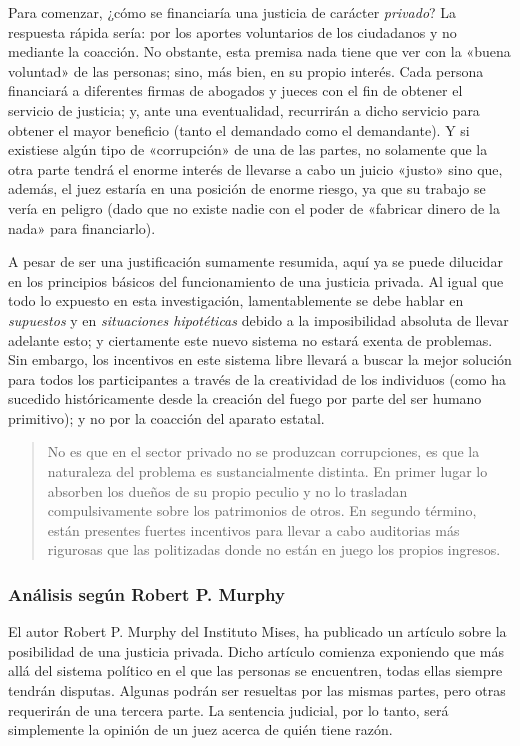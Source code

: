 \documentclass[12pt,a4paper,twoside]{book}
\begin{document}
Para comenzar, ¿cómo se financiaría una justicia de carácter \textit{privado}? La respuesta rápida sería: por los aportes voluntarios de los ciudadanos y no mediante la coacción. No obstante, esta premisa nada tiene que ver con la «buena voluntad» de las personas; sino, más bien, en su propio interés. Cada persona financiará a diferentes firmas de abogados y jueces con el fin de obtener el servicio de justicia; y, ante una eventualidad, recurrirán a dicho servicio para obtener el mayor beneficio (tanto el demandado como el demandante). Y si existiese algún tipo de «corrupción» de una de las partes, no solamente que la otra parte tendrá el enorme interés de llevarse a cabo un juicio «justo» sino que, además, el juez estaría en una posición de enorme riesgo, ya que su trabajo se vería en peligro (dado que no existe nadie con el poder de «fabricar dinero de la nada» para financiarlo).

A pesar de ser una justificación sumamente resumida, aquí ya se puede dilucidar en los principios básicos del funcionamiento de una justicia privada. Al igual que todo lo expuesto en esta investigación, lamentablemente se debe hablar en \textit{supuestos} y en \textit{situaciones hipotéticas} debido a la imposibilidad absoluta de llevar adelante esto; y ciertamente este nuevo sistema no estará exenta de problemas. Sin embargo, los incentivos en este sistema libre llevará a buscar la mejor solución para todos los participantes a través de la creatividad de los individuos (como ha sucedido históricamente desde la creación del fuego por parte del ser humano primitivo); y no por la coacción del aparato estatal.

\begin{quotation}
No es que en el sector privado no se produzcan corrupciones, es que la naturaleza del problema es sustancialmente distinta. En primer lugar lo absorben los dueños de su propio peculio y no lo trasladan compulsivamente sobre los patrimonios de otros. En segundo término, están presentes fuertes incentivos para llevar a cabo auditorias más rigurosas que las politizadas donde no están en juego los propios ingresos. \cite{abl:corrupcion}
\end{quotation}

\subsubsection{Análisis según Robert P. Murphy}
El autor Robert P. Murphy del Instituto Mises, ha publicado un artículo sobre la posibilidad de una justicia privada. Dicho artículo comienza exponiendo que más allá del sistema político en el que las personas se encuentren, todas ellas siempre tendrán disputas. Algunas podrán ser resueltas por las mismas partes, pero otras requerirán de una tercera parte. La sentencia judicial, por lo tanto, será simplemente la opinión de un juez acerca de quién tiene razón.
\end{document}
